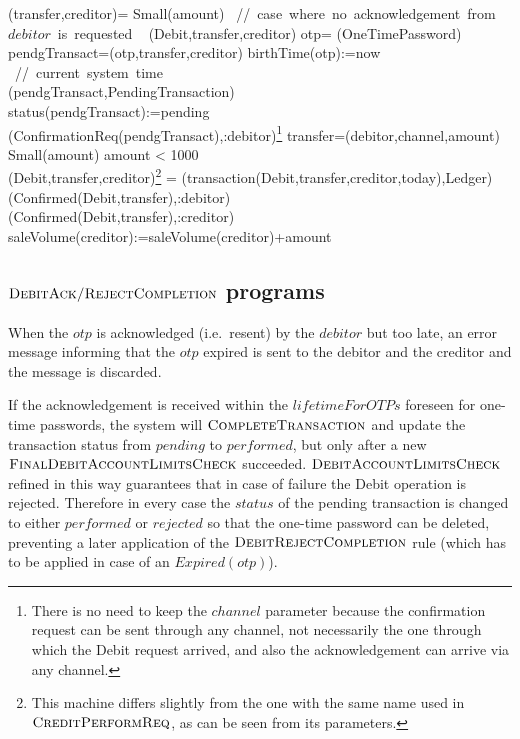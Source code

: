\begin{asm}
(transfer,creditor)=\+
\IF Small(amount) 
\mbox{  // case where no acknowledgement from $debitor$ is requested}\+
   \THEN ~ (Debit,transfer,creditor) \-
   \ELSE \+
       \LET otp= \NEW(OneTimePassword)\\
       \LET pendgTransact=(otp,transfer,creditor)\+
          birthTime(otp):=now \mbox{ // current system time}\\
          (pendgTransact,PendingTransaction)\\ 
          status(pendgTransact):=pending \\
          (ConfirmationReq(pendgTransact),\TO :debitor)\footnote{There is no need to keep the $channel$ parameter because the confirmation request can be sent through any channel, not necessarily the one through which the Debit request arrived, and also the acknowledgement can arrive via any channel.}
       \dec\-
\WHERE \+
transfer=(debitor,channel,amount)\\
Small(amount) \IFF amount < 1000 \\
 (Debit,transfer,creditor)\footnote{This machine differs slightly from the one with the same name used in $\hbox{\sc CreditPerformReq}$, as can be seen from its parameters.} =\+     
   (transaction(Debit,transfer,creditor,today),Ledger)\\
   (Confirmed(Debit,transfer),\TO :debitor)\\
   (Confirmed(Debit,transfer),\TO :creditor)\\
   saleVolume(creditor):=saleVolume(creditor)+amount
\end{asm}


\subsection{ $\hbox{\sc DebitAck/RejectCompletion}$ programs}
\label{sect:debitackreject}

When the $otp$ is acknowledged (i.e.\ resent) by the $debitor$ but too late, an error message informing that the $otp$ expired is sent to the debitor and the creditor and the message is discarded.

If the acknowledgement is received within the $lifetimeForOTPs$ foreseen for one-time passwords, the system will $\hbox{\sc CompleteTransaction}$ and update the transaction status from $pending$ to $performed$, but only after a new $\hbox{\sc FinalDebitAccountLimitsCheck}$ succeeded. $\hbox{\sc DebitAccountLimitsCheck}$  refined in this way guarantees that in case of failure the Debit operation is rejected. Therefore in every case the $status$ of the pending transaction is changed to either $performed$ or $rejected$ so that the one-time password can be deleted,  preventing a later application of the $\hbox{\sc DebitRejectCompletion}$ rule (which has to be applied in case of an $Expired(otp)$).


